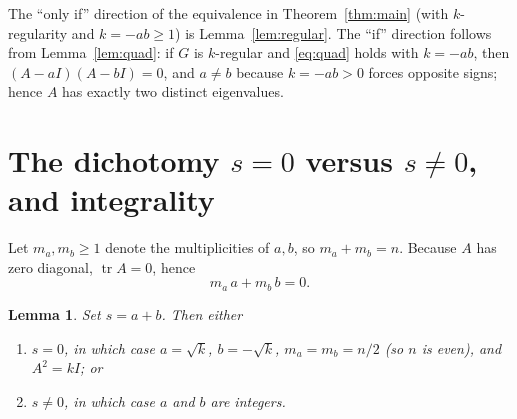 \documentclass{amsart}
\newtheorem{lemma}{Lemma}
\theoremstyle{definition}
\begin{document}
The ``only if'' direction of the equivalence in Theorem~\ref{thm:main} (with
$k$-regularity and $k=-ab\ge1$) is Lemma~\ref{lem:regular}. The ``if''
direction follows from Lemma~\ref{lem:quad}: if $G$ is $k$-regular and
\eqref{eq:quad} holds with $k=-ab$, then $(A-aI)(A-bI)=0$, and $a\ne b$ because
$k=-ab>0$ forces opposite signs; hence $A$ has exactly two distinct
eigenvalues.

\section{The dichotomy $s=0$ versus $s\ne0$, and integrality}\label{sec:dichotomy}

Let $m_a,m_b\ge1$ denote the multiplicities of $a,b$, so $m_a+m_b=n$. Because
$A$ has zero diagonal, $\operatorname{tr}A=0$, hence
\begin{equation}\label{eq:trace}
m_a\,a+m_b\,b=0 .
\end{equation}

\begin{lemma}\label{lem:dichotomy}
Set $s=a+b$. Then either
\begin{enumerate}
\item[(I)] $s=0$, in which case $a=\sqrt k$, $b=-\sqrt k$, $m_a=m_b=n/2$ (so
$n$ is even), and $A^2=kI$; or
\item[(II)] $s\ne0$, in which case $a$ and $b$ are integers.
\end{enumerate}
\end{lemma}
\end{document}
